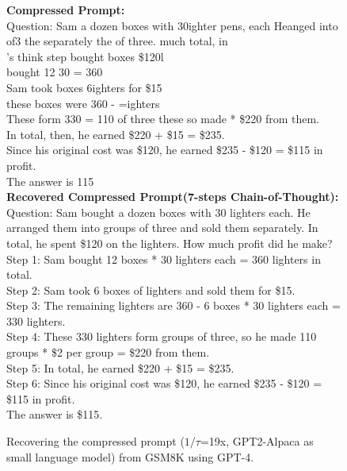 \begin{figure*}
	\centering
	\begin{minipage}[t]{\linewidth}
       \begin{tcolorbox}
        \textbf{Compressed Prompt:}\\
        Question: Sam a dozen boxes with 30ighter pens, each Heanged into of3 the separately the of three. much total, in\\
        's think step bought boxes \$120l\\
         bought 12 30 = 360\\
        Sam took boxes 6ighters for \$15\\
         these boxes were 360 - =ighters\\
        These form 330 = 110 of three these so made * \$220 from them.\\
        In total, then, he earned \$220 + \$15 = \$235.\\
        Since his original cost was \$120, he earned \$235 - \$120 = \$115 in profit.\\
        The answer is 115\\
        \textbf{Recovered Compressed Prompt(7-steps Chain-of-Thought):}\\
        Question: Sam bought a dozen boxes with 30 lighters each. He arranged them into groups of three and sold them separately. In total, he spent \$120 on the lighters. How much profit did he make?\\
        Step 1: Sam bought 12 boxes * 30 lighters each = 360 lighters in total.\\
        Step 2: Sam took 6 boxes of lighters and sold them for \$15.\\
        Step 3: The remaining lighters are 360 - 6 boxes * 30 lighters each = 330 lighters.\\
        Step 4: These 330 lighters form groups of three, so he made 110 groups * \$2 per group = \$220 from them.\\
        Step 5: In total, he earned \$220 + \$15 = \$235.\\
        Step 6: Since his original cost was \$120, he earned \$235 - \$120 = \$115 in profit.\\
        The answer is \$115.
        \end{tcolorbox}
        \caption{Recovering the compressed prompt ($1/\tau$=19x, GPT2-Alpaca as small language model) from GSM8K using GPT-4.}

\end{minipage}
\end{figure*}
